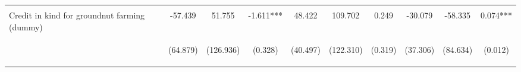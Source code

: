 \begin{center}
\begin{tabular}{lccccccccc}
\vspace{4pt} & \begin{footnotesize}[0.196]\end{footnotesize} & \begin{footnotesize}[0.288]\end{footnotesize} & \begin{footnotesize}[0.693]\end{footnotesize} & \begin{footnotesize}[0.252]\end{footnotesize} & \begin{footnotesize}[0.108]\end{footnotesize} & \begin{footnotesize}[0.063]\end{footnotesize} & \begin{footnotesize}[0.106]\end{footnotesize} & \begin{footnotesize}[0.609]\end{footnotesize} & \begin{footnotesize}[0.074]\end{footnotesize} \\
Credit in kind for groundnut farming (dummy) & -57.439 & 51.755 & -1.611*** & 48.422 & 109.702 & 0.249 & -30.079 & -58.335 & 0.074*** \\
 & \begin{footnotesize}(64.879)\end{footnotesize} & \begin{footnotesize}(126.936)\end{footnotesize} & \begin{footnotesize}(0.328)\end{footnotesize} & \begin{footnotesize}(40.497)\end{footnotesize} & \begin{footnotesize}(122.310)\end{footnotesize} & \begin{footnotesize}(0.319)\end{footnotesize} & \begin{footnotesize}(37.306)\end{footnotesize} & \begin{footnotesize}(84.634)\end{footnotesize} & \begin{footnotesize}(0.012)\end{footnotesize} \\

\end{tabular}
\end{center}
